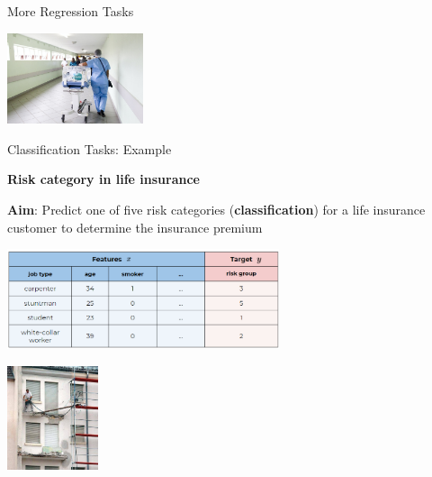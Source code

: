 \documentclass[11pt,compress,t,notes=noshow, xcolor=table]{beamer}
\begin{document}
\begin{vbframe}{More Regression Tasks}
\begin{enumerate}
\begin{center}
    \lz
    
    \includegraphics[width=0.3\textwidth]{figure_man/ml-basics-supervised-task-hosp-pic.jpg} 
    
    \end{center}
    
  
  
\end{enumerate}

\end{vbframe}


\begin{vbframe}{Classification Tasks: Example}

\textbf{Risk category in life insurance}

  \textbf{Aim}: Predict one of five risk categories (\textbf{classification}) for a life insurance customer to determine the insurance premium 
\begin{center}

    \includegraphics[width=0.6\textwidth]{figure_man/ml-basics-supervised-task-insurance-data.png} 

\lz

  \includegraphics[width = 0.2\textwidth]{figure_man/classif_ex_placeholder.jpg} 
\end{center}

\end{vbframe}
\end{document}
